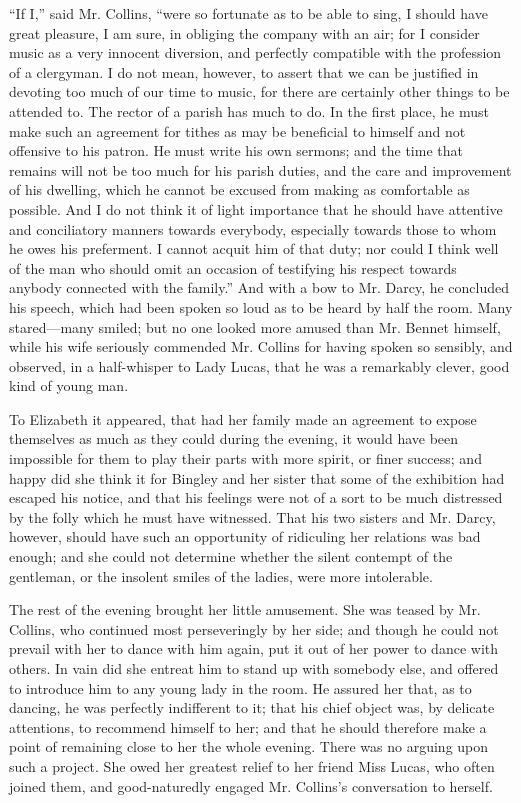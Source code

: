 \documentclass[12pt,openright]{book}
\begin{document}
“If I,” said Mr. Collins, “were so fortunate as to be able to sing, I should have great pleasure, I am sure, in obliging the company with an air; for I consider music as a very innocent diversion, and perfectly compatible with the profession of a clergyman. I do not mean, however, to assert that we can be justified in devoting too much of our time to music, for there are certainly other things to be attended to. The rector of a parish has much to do. In the first place, he must make such an agreement for tithes as may be beneficial to himself and not offensive to his patron. He must write his own sermons; and the time that remains will not be too much for his parish duties, and the care and improvement of his dwelling, which he cannot be excused from making as comfortable as possible. And I do not think it of light importance that he should have attentive and conciliatory manners towards everybody, especially towards those to whom he owes his preferment. I cannot acquit him of that duty; nor could I think well of the man who should omit an occasion of testifying his respect towards anybody connected with the family.” And with a bow to Mr. Darcy, he concluded his speech, which had been spoken so loud as to be heard by half the room. Many stared—many smiled; but no one looked more amused than Mr. Bennet himself, while his wife seriously commended Mr. Collins for having spoken so sensibly, and observed, in a half-whisper to Lady Lucas, that he was a remarkably clever, good kind of young man.

To Elizabeth it appeared, that had her family made an agreement to expose themselves as much as they could during the evening, it would have been impossible for them to play their parts with more spirit, or finer success; and happy did she think it for Bingley and her sister that some of the exhibition had escaped his notice, and that his feelings were not of a sort to be much distressed by the folly which he must have witnessed. That his two sisters and Mr. Darcy, however, should have such an opportunity of ridiculing her relations was bad enough; and she could not determine whether the silent contempt of the gentleman, or the insolent smiles of the ladies, were more intolerable.

The rest of the evening brought her little amusement. She was teased by Mr. Collins, who continued most perseveringly by her side; and though he could not prevail with her to dance with him again, put it out of her power to dance with others. In vain did she entreat him to stand up with somebody else, and offered to introduce him to any young lady in the room. He assured her that, as to dancing, he was perfectly indifferent to it; that his chief object was, by delicate attentions, to recommend himself to her; and that he should therefore make a point of remaining close to her the whole evening. There was no arguing upon such a project. She owed her greatest relief to her friend Miss Lucas, who often joined them, and good-naturedly engaged Mr. Collins’s conversation to herself.
\end{document}
